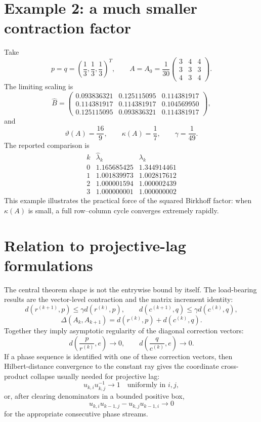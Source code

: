 \section*{Example 2: a much smaller contraction factor}
Take
\[
  p=q=\left(\frac13,\frac13,\frac13\right)^T,
  \qquad
  A=A_0=\frac1{30}
  \begin{pmatrix}
    3&4&4\\
    3&3&3\\
    4&3&4
  \end{pmatrix}.
\]
The limiting scaling is
\[
  \widehat B=
  \begin{pmatrix}
    0.093836321&0.125115095&0.114381917\\
    0.114381917&0.114381917&0.104569950\\
    0.125115095&0.093836321&0.114381917
  \end{pmatrix},
\]
and
\[
  \vartheta(A)=\frac{16}{9},
  \qquad
  \kappa(A)=\frac17,
  \qquad
  \gamma=\frac1{49}.
\]
The reported comparison is
\[
\begin{array}{c|cc}
 k&\widehat\lambda_k&\lambda_k\\\hline
 0&1.165685425&1.344914461\\
 1&1.001839973&1.002817612\\
 2&1.000001594&1.000002439\\
 3&1.000000001&1.000000002
\end{array}
\]
This example illustrates the practical force of the squared Birkhoff factor:
when $\kappa(A)$ is small, a full row--column cycle converges extremely rapidly.

\section*{Relation to projective-lag formulations}
The central theorem shape is not the entrywise bound by itself.
The load-bearing results are the vector-level contraction and the matrix increment
identity:
\[
  d(r^{(k+1)},p)\le \gamma d(r^{(k)},p),
  \qquad
  d(c^{(k+1)},q)\le \gamma d(c^{(k)},q),
\]
\[
  \Delta(A_k,A_{k+1})=d(r^{(k)},p)+d(c^{(k)},q).
\]
Together they imply asymptotic regularity of the diagonal correction vectors:
\[
  d\left(\frac{p}{r^{(k)}},e\right)\to 0,
  \qquad
  d\left(\frac{q}{c^{(k)}},e\right)\to 0.
\]
If a phase sequence is identified with one of these correction vectors,
then Hilbert-distance convergence to the constant ray gives the coordinate
cross-product collapse usually needed for projective lag:
\[
  u_{k,i}u_{k,j}^{-1}\to 1
  \quad\text{uniformly in }i,j,
\]
or, after clearing denominators in a bounded positive box,
\[
  u_{k,i}u_{k-1,j}-u_{k,j}u_{k-1,i}\to 0
\]
for the appropriate consecutive phase streams.

